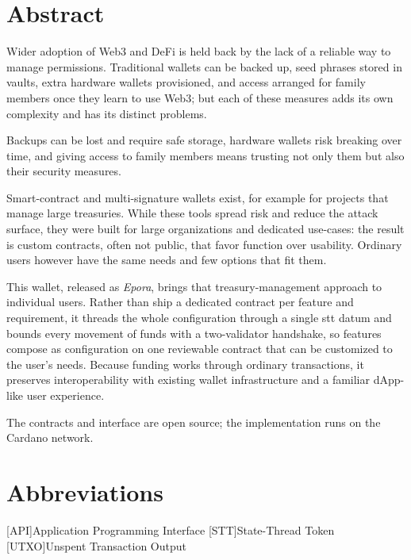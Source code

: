 \documentclass[11pt,DIV=11,parskip=half-]{scrartcl}
\begin{document}
\newpage
\section*{Abstract}

Wider adoption of Web3 and DeFi is held back by the lack of a reliable way to manage permissions. Traditional wallets can be backed up, seed phrases stored in vaults, extra hardware wallets provisioned, and access arranged for family members once they learn to use Web3; but each of these measures adds its own complexity and has its distinct problems.

Backups can be lost and require safe storage, hardware wallets risk breaking over time, and giving access to family members means trusting not only them but also their security measures.

Smart-contract and multi-signature wallets exist, for example for projects that manage large treasuries. While these tools spread risk and reduce the attack surface, they were built for large organizations and dedicated use-cases: the result is custom contracts, often not public, that favor function over usability. Ordinary users however have the same needs and few options that fit them.

This wallet, released as \emph{Epora}, brings that treasury-management approach to individual users. Rather than ship a dedicated contract per feature and requirement, it threads the whole configuration through a single \gls{stt} datum and bounds every movement of funds with a two-validator handshake, so features compose as configuration on one reviewable contract that can be customized to the user's needs. Because funding works through ordinary transactions, it preserves interoperability with existing wallet infrastructure and a familiar dApp-like user experience.

The contracts and interface are open source; the implementation runs on the Cardano network.
\newpage

\tableofcontents
\newpage
\hypersetup{pageanchor=true}
\section*{Abbreviations}
%
\begin{acronym}
[API]{Application Programming Interface}
[STT]{State-Thread Token}
[UTXO]{Unspent Transaction Output}
\end{acronym}
\end{document}
